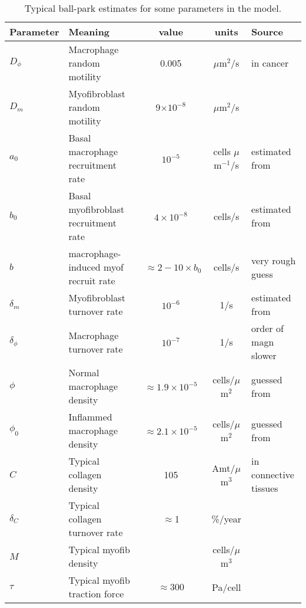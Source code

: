 \documentclass{article}
\begin{document}
    \begin{table}[H]
    \centering
    \begin{tabular}{|l|l|c|c|l|} \hline
     Parameter & Meaning &value &units & Source  \\ \hline
     
    $D_\phi$ & Macrophage random motility & 0.005 & $\mu$m$^2$/s &in cancer \cite{owen1997pattern,khajanchi2021spatiotemporal} \\
    
    $D_m$ & Myofibroblast random motility & 9$\times 10^{-8}$ & $\mu$m$^2$/s & \cite{thampatty2007new} \\
      
    $a_0$& Basal macrophage recruitment rate&$10^{-5}$& cells $\mu$m$^{-1}$/s& estimated from \cite{gupta2006spatiotemporal}\\
      
    $b_0$&Basal myofibroblast recruitment rate & $4 \times 10^{-8}$& cells/s& estimated from \cite{masur1996myofibroblasts,gascard2016carcinoma} \\
    $b$&macrophage-induced myof recruit rate& ~$\approx 2-10\times b_0$& cells/s&very rough guess\\
    
    $\delta_m$&Myofibroblast turnover rate& $10^{-6}$& 1/s& estimated from \cite{masur1996myofibroblasts}\\

    $\delta_\phi$&Macrophage turnover rate& $10^{-7}$&1/s& order of magn slower \cite{owen1997pattern}\\

    $\phi$&Normal macrophage density & $\approx 1.9 \times 10^{-5}$ &cells/$\mu$m$^2$ & guessed from \cite{degnim2014immune}\\
 
    $\phi_0$  &Inflammed macrophage density & $\approx2.1\times10^{-5}$ &cells/$\mu$m$^2$ & guessed from \cite{degnim2014immune}\\
      
    $C$  &Typical collagen density & 105
        &Amt/$\mu$m$^3$& in connective tissues \cite{rutenberg2016uniform}\\

    $\delta_C$ &Typical collagen turnover rate&
       $\approx$1 & \%/year & \cite{hackenberg2020collagen,verzijl2000effect}\\
        
    $M$ &Typical myofib density& 
      &cells/$\mu$m$^3$ & \cite{risom2022transition}\\
      
    $\tau$ &Typical myofib traction force& $\approx 300$ & Pa/cell & \cite{chen2007alpha} \\   \hline
    \end{tabular}
    \caption{Typical ball-park estimates for some parameters in the model.}
    \label{tab:paramsSearch}
    \end{table}
\end{document}

